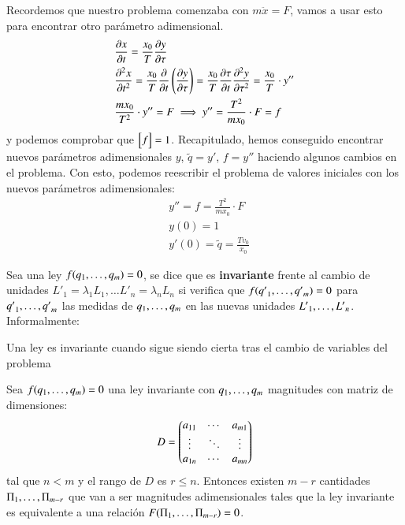 \begin{eg}
    Recordemos que nuestro problema comenzaba con $m\ddot x = F$, vamos a usar esto para encontrar otro parámetro adimensional.
    \begin{align*}
        &\frac{\partial x}{\partial t} = \frac{x_0}{T} \frac{\partial y}{\partial \tau}\\
        &\frac{\partial^{2} x}{\partial t^{2}} = \frac{x_0}{T} \frac{\partial}{\partial t} \left(\frac{\partial y}{\partial \tau}\right) = \frac{x_0}{T} \frac{\partial \tau}{\partial t} \frac{\partial^{2} y}{\partial \tau^{2}} = \frac{x_0}{T} \cdot y''\\
        & \frac{mx_0}{T^2} \cdot y'' = F \implies y'' = \frac{T^2}{mx_0}\cdot F = f
    \end{align*}
    y podemos comprobar que $\mx{f} = 1$. Recapitulado, hemos conseguido encontrar nuevos parámetros adimensionales $y$, $\tilde q = y'$, $f = y''$ haciendo algunos cambios en el problema. Con esto, podemos reescribir el problema de valores iniciales con los nuevos parámetros adimensionales:
    \begin{align*}
        &y'' = f = \frac{T^2}{mx_0}\cdot F\\
        &y(0) = 1\\
        &y'(0) = \tilde q = \frac{T v_0}{x_0}
    \end{align*}
\end{eg}

\begin{dfn}
    Sea una ley $f({q}_{1}, \ldots, {q}_{m}) = 0$, se dice que es \textbf{invariante} frente al cambio de unidades $L'_1 = \lambda_1 L_1, \ldots L'_n = \lambda_n L_n$ si verifica que $f({q'}_{1}, \ldots, {q'}_{m}) = 0$ para ${q'}_{1}, \ldots, {q'}_{m}$ las medidas de ${q}_{1}, \ldots, {q}_{m}$ en las nuevas unidades ${L'}_{1}, \ldots, {L'}_{n}$. Informalmente:\\
    \begin{center}
        Una ley es invariante cuando sigue siendo cierta tras el cambio de variables del problema
    \end{center}
\end{dfn}

\begin{thm}[Teorema $\Pi$]\label{thm:pi}
    Sea $f({q}_{1}, \ldots, {q}_{m}) = 0$ una ley invariante con ${q}_{1}, \ldots, {q}_{m}$ magnitudes con matriz de dimensiones:
    $$
        D = \dmx{
            a_{11} & \cdots & a_{m1}\\
            \vdots & \ddots & \vdots\\
            a_{1n} & \cdots & a_{mn}
        }
    $$
    tal que $n < m$ y el rango de $D$ es $r \leq n$. Entonces existen $m - r$ cantidades ${\Pi}_{1}, \ldots, {\Pi}_{m-r}$ que van a ser magnitudes adimensionales tales que la ley invariante es equivalente a una relación $F({\Pi}_{1}, \ldots, {\Pi}_{m-r}) = 0$.
\end{thm}

